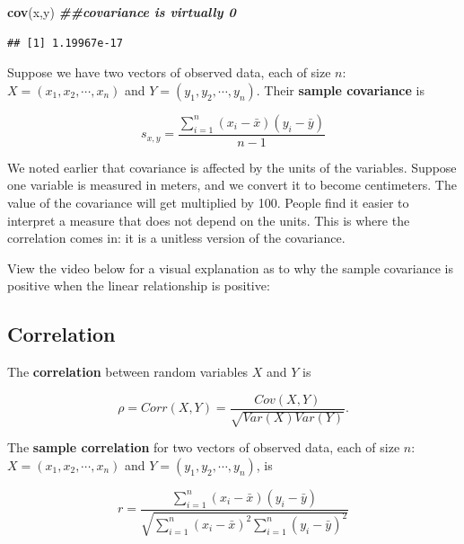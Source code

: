 \documentclass[
]{book}
\newenvironment{Shaded}{\begin{snugshade}}{\end{snugshade}}
\newcommand{\DocumentationTok}[1]{\textcolor[rgb]{0.56,0.35,0.01}{\textbf{\textit{#1}}}}
\newcommand{\FunctionTok}[1]{\textcolor[rgb]{0.13,0.29,0.53}{\textbf{#1}}}
\newcommand{\NormalTok}[1]{#1}
\begin{document}
\begin{Shaded}
\begin{Highlighting}[]
\FunctionTok{cov}\NormalTok{(x,y) }\DocumentationTok{\#\#covariance is virtually 0}
\end{Highlighting}
\end{Shaded}

\begin{verbatim}
## [1] 1.19967e-17
\end{verbatim}

Suppose we have two vectors of observed data, each of size \(n\): \(X = (x_1, x_2, \cdots, x_n)\) and \(Y = (y_1, y_2, \cdots, y_n)\). Their \textbf{sample covariance} is

\begin{equation} 
s_{x,y} = \frac{\sum_{i=1}^n (x_i - \bar{x})(y_i - \bar{y})}{n-1}
\label{eq:5-sampcov}
\end{equation}

We noted earlier that covariance is affected by the units of the variables. Suppose one variable is measured in meters, and we convert it to become centimeters. The value of the covariance will get multiplied by 100. People find it easier to interpret a measure that does not depend on the units. This is where the correlation comes in: it is a unitless version of the covariance.

View the video below for a visual explanation as to why the sample covariance is positive when the linear relationship is positive:

\hypertarget{corr}{%
\subsection{Correlation}\label{corr}}

The \textbf{correlation} between random variables \(X\) and \(Y\) is

\begin{equation} 
\rho = Corr(X,Y) = \frac{Cov(X,Y)}{\sqrt{Var(X) Var(Y)}}.
\label{eq:5-corr}
\end{equation}

The \textbf{sample correlation} for two vectors of observed data, each of size \(n\): \(X = (x_1, x_2, \cdots, x_n)\) and \(Y = (y_1, y_2, \cdots, y_n)\), is

\begin{equation} 
r = \frac{\sum_{i=1}^n (x_i - \bar{x})(y_i - \bar{y})}{\sqrt{\sum_{i=1}^n (x_i - \bar{x})^2 \sum_{i=1}^n (y_i - \bar{y})^2}}
\label{eq:5-sampcorr}
\end{equation}
\end{document}
